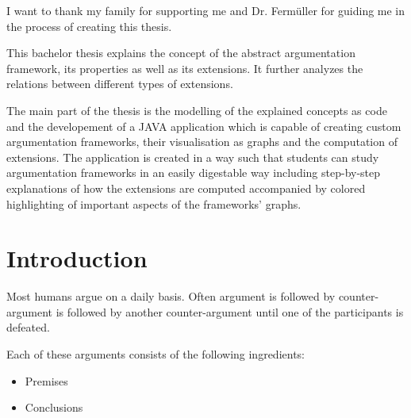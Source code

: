 \documentclass[draft,final]{vutinfth} %
\newcommand{\hl}{\par\vspace{6pt}} %
\begin{document}
\frontmatter %

\addstatementpage

\begin{acknowledgements*}
I want to thank my family for supporting me and Dr. Ferm{\"u}ller for guiding me in the process of creating this thesis.
\end{acknowledgements*}

\begin{abstract*}
This bachelor thesis explains the concept of the abstract argumentation framework, its properties as well as its extensions. It further analyzes the relations between different types of extensions.\hl
The main part of the thesis is the modelling of the explained concepts as code and the developement of a JAVA application which is capable of creating custom argumentation frameworks, their visualisation as graphs and the computation of extensions. The application is created in a way such that students can study argumentation frameworks in an easily digestable way including step-by-step explanations of how the extensions are computed accompanied by colored highlighting of important aspects of the frameworks' graphs.\\ %
\end{abstract*}


\tableofcontents* %

\mainmatter

\chapter{Introduction}
Most humans argue on a daily basis. Often argument is followed by counter-argument is followed by another counter-argument until one of the participants is defeated.\hl
Each of these arguments consists of the following ingredients:

\begin{itemize}
	\item Premises
	\item Conclusions
\end{itemize}
\end{document}
